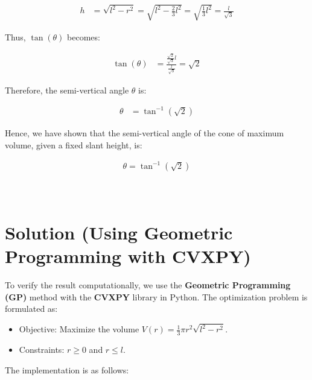\documentclass[journal]{IEEEtran}
\begin{document}
\begin{align}
h &= \sqrt{l^2 - r^2} = \sqrt{l^2 - \frac{2}{3} l^2} = \sqrt{\frac{1}{3} l^2} = \frac{l}{\sqrt{3}}
\end{align}

Thus, \( \tan(\theta) \) becomes:

\begin{align}
\tan(\theta) &= \frac{\frac{\sqrt{2}}{\sqrt{3}} l}{\frac{l}{\sqrt{3}}} = \sqrt{2}
\end{align}

Therefore, the semi-vertical angle \( \theta \) is:

\begin{align}
\theta &= \tan^{-1}(\sqrt{2})
\end{align}

Hence, we have shown that the semi-vertical angle of the cone of maximum volume, given a fixed slant height, is:

\begin{align}
\boxed{\theta = \tan^{-1}(\sqrt{2})}
\end{align}
\\ \\

\section*{Solution (Using Geometric Programming with CVXPY)}
To verify the result computationally, we use the \textbf{Geometric Programming (GP)} method with the \textbf{CVXPY} library in Python. The optimization problem is formulated as:

\begin{itemize}
    \item Objective: Maximize the volume \( V(r) = \frac{1}{3} \pi r^2 \sqrt{l^2 - r^2} \).
    \item Constraints: \( r \geq 0 \) and \( r \leq l \).
\end{itemize}

The implementation is as follows:
\end{document}
